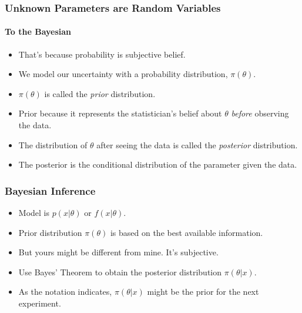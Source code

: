\documentclass[12pt]{beamer}
\begin{document}
\begin{frame}
	\frametitle{Unknown Parameters are Random Variables}
	\framesubtitle{To the Bayesian}
	
	\begin{itemize}[label={\color{blue}$\blacktriangleright$}]
		\item That's because probability is subjective belief.
		
		\item We model our uncertainty with a probability distribution, $\pi(\theta)$.
		
		\item $\pi(\theta)$ is called the \textit{prior} distribution.
		
		\item Prior because it represents the statistician's belief about $\theta$ \textit{before} observing the data.
		
		\item The distribution of $\theta$ after seeing the data is called the \textit{posterior} distribution.
		
		\item The posterior is the conditional distribution of the parameter given the data.
	\end{itemize}
	
\end{frame}
\begin{frame}
	\frametitle{Bayesian Inference}
	
	\begin{itemize}[label={\color{blue}$\blacktriangleright$}]
		\item Model is $p(x|\theta)$ or $f(x|\theta)$.
		
		\item Prior distribution $\pi(\theta)$ is based on the best available information.
		
		\item But yours might be different from mine. It's subjective.
		
		\item Use Bayes' Theorem to obtain the posterior distribution $\pi(\theta|x)$.
		
		\item As the notation indicates, $\pi(\theta|x)$ might be the prior for the next experiment.
	\end{itemize}
	
\end{frame}
\end{document}
